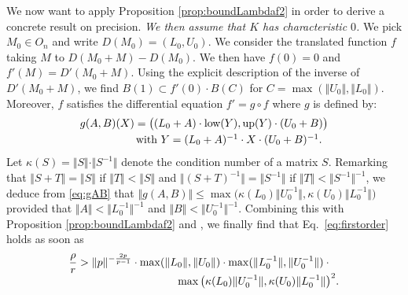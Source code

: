 \documentclass{sig-alternate-2013}
\newcommand{\low}{\text{\rm low}}
\newcommand{\up}{\text{\rm up}}
\begin{document}
We now want to apply Proposition \ref{prop:boundLambdaf2} in order to 
derive a concrete result on precision. \emph{We then assume that $K$ has 
characteristic $0$.} We pick $M_0 \in
O_n$ and write $D(M_0) = (L_0,U_0)$. We consider the translated
function $f$ taking $M$ to $D(M_0+M)-D(M_0)$. We then have $f(0) = 0$ 
and $f'(M) = D'(M_0+M)$. Using the explicit description of the inverse
of $D'(M_0+M)$, we find $B(1) \subset f'(0) \cdot B(C)$
for $C = \max(\Vert U_0 \Vert, \Vert L_0 \Vert)$. Moreover, $f$ satisfies 
the differential equation $f' = g \circ f$ where $g$ is defined by:
\begin{equation}
\label{eq:gAB}
\begin{array}{l}
g(A,B)(X) = \big( (L_0+A) \cdot \low(Y), \up(Y) \cdot (U_0+B) \big)
\smallskip \\
\hspace{1.8cm}\text{with } Y = (L_0+A)^{-1} \cdot X \cdot (U_0+B)^{-1}.
\end{array}
\end{equation}
Let $\kappa(S) = \Vert S \Vert \cdot \Vert S^{-1} \Vert$ denote the 
condition number of a matrix $S$. Remarking that $\Vert S + T 
\Vert = \Vert S \Vert$ if $\Vert T \Vert < \Vert S \Vert$ and $\Vert (S 
+ T)^{-1} \Vert = \Vert S^{-1} \Vert$ if $\Vert T \Vert < \Vert S^{-1} 
\Vert^{-1}$, we deduce from \eqref{eq:gAB} that
$\Vert g(A,B) \Vert \leq \max 
\big( \kappa(L_0) \Vert U_0^{-1} \Vert, 
\kappa(U_0) \Vert L_0^{-1} \Vert \big)$
provided that $\Vert A \Vert < \Vert L_0^{-1} \Vert^{-1}$ and 
$\Vert B \Vert < \Vert U_0^{-1} \Vert^{-1}$.
Combining this with Proposition \ref{prop:boundLambdaf2} and 
\cite[Proposition.~3.12]{caruso-roe-vaccon:14a}, we finally find that 
Eq.~\eqref{eq:firstorder} holds as soon as 
$$\begin{array}{l}
\displaystyle \frac \rho r > \Vert p \Vert^{-\frac{2p}{p-1}} \cdot
\max ( \Vert L_0 \Vert, \Vert U_0 \Vert) \cdot
\max ( \Vert L_0 ^{-1} \Vert, \Vert U_0 ^{-1} \Vert) \cdot{} \\
\hspace{3.5cm} \max \big( \kappa(L_0) \Vert U_0^{-1} \Vert, 
  \kappa(U_0) \Vert L_0^{-1} \Vert \big)^2.
\end{array}$$
\end{document}
